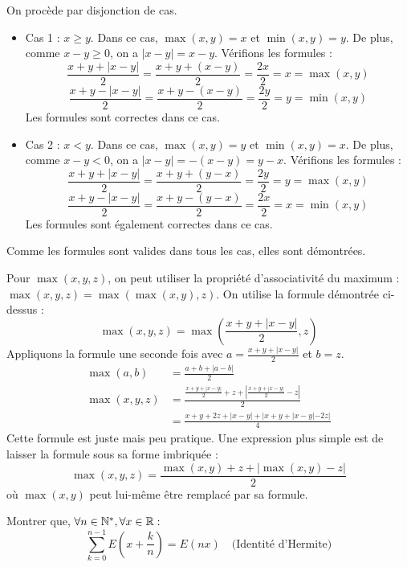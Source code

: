 \documentclass[solutions]{exercices}
\begin{document}
\begin{solution}
	On procède par disjonction de cas.
	\begin{itemize}
		\item Cas 1 : $x \geq y$.
		      Dans ce cas, $\max(x,y)=x$ et $\min(x,y)=y$.
		      De plus, comme $x-y \geq 0$, on a $|x-y|=x-y$.
		      Vérifions les formules :
		      \[ \frac{x+y+|x-y|}{2} = \frac{x+y+(x-y)}{2} = \frac{2x}{2} = x = \max(x,y) \]
		      \[ \frac{x+y-|x-y|}{2} = \frac{x+y-(x-y)}{2} = \frac{2y}{2} = y = \min(x,y) \]
		      Les formules sont correctes dans ce cas.
		\item Cas 2 : $x < y$.
		      Dans ce cas, $\max(x,y)=y$ et $\min(x,y)=x$.
		      De plus, comme $x-y < 0$, on a $|x-y|=-(x-y)=y-x$.
		      Vérifions les formules :
		      \[ \frac{x+y+|x-y|}{2} = \frac{x+y+(y-x)}{2} = \frac{2y}{2} = y = \max(x,y) \]
		      \[ \frac{x+y-|x-y|}{2} = \frac{x+y-(y-x)}{2} = \frac{2x}{2} = x = \min(x,y) \]
		      Les formules sont également correctes dans ce cas.
	\end{itemize}
	Comme les formules sont valides dans tous les cas, elles sont démontrées.

	Pour $\max(x,y,z)$, on peut utiliser la propriété d'associativité du maximum : $\max(x,y,z) = \max(\max(x,y), z)$.
	On utilise la formule démontrée ci-dessus :
	\[ \max(x,y,z) = \max\left(\frac{x+y+|x-y|}{2}, z\right) \]
	Appliquons la formule une seconde fois avec $a = \frac{x+y+|x-y|}{2}$ et $b = z$.
	\begin{align*}
		\max(a,b)   & = \frac{a+b+|a-b|}{2}                                                      \\
		\max(x,y,z) & = \frac{\frac{x+y+|x-y|}{2} + z + \left|\frac{x+y+|x-y|}{2} - z\right|}{2} \\
		            & = \frac{x+y+2z+|x-y| + |x+y+|x-y|-2z|}{4}
	\end{align*}
	Cette formule est juste mais peu pratique. Une expression plus simple est de laisser la formule sous sa forme imbriquée :
	\[ \max(x,y,z) = \frac{\max(x,y)+z+|\max(x,y)-z|}{2} \]
	où $\max(x,y)$ peut lui-même être remplacé par sa formule.
\end{solution}


\begin{exercice}[\st]
	Montrer que, $\forall n \in \mathbb{N}^*, \forall x \in \mathbb{R} :$
	\[ \sum_{k=0}^{n-1} E\left(x + \frac{k}{n}\right) = E(nx) \quad \text{(Identité d'Hermite)} \]
\end{exercice}
\end{document}

